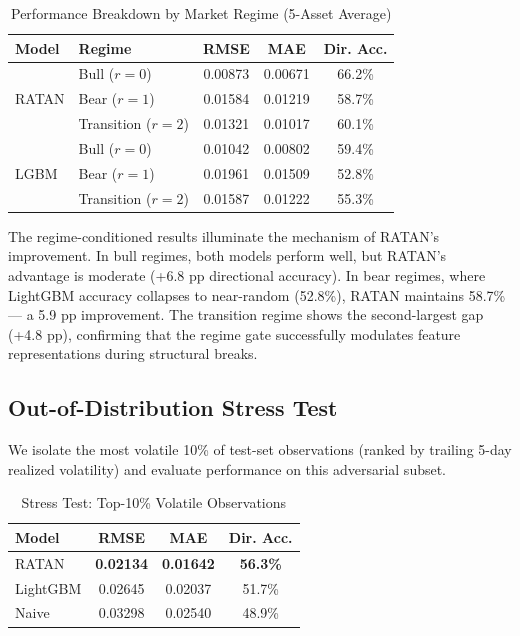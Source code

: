 \documentclass[conference]{IEEEtran}
\begin{document}
\begin{table}[ht]
\centering
\caption{Performance Breakdown by Market Regime (5-Asset Average)}
\label{tab:regime}
\begin{tabular}{@{}llccc@{}}
\toprule
\textbf{Model} & \textbf{Regime} & \textbf{RMSE} & \textbf{MAE} & \textbf{Dir. Acc.} \\
\midrule
\multirow{3}{*}{RATAN}
& Bull ($r=0$)       & 0.00873 & 0.00671 & 66.2\% \\
& Bear ($r=1$)       & 0.01584 & 0.01219 & 58.7\% \\
& Transition ($r=2$) & 0.01321 & 0.01017 & 60.1\% \\
\midrule
\multirow{3}{*}{LGBM}
& Bull ($r=0$)       & 0.01042 & 0.00802 & 59.4\% \\
& Bear ($r=1$)       & 0.01961 & 0.01509 & 52.8\% \\
& Transition ($r=2$) & 0.01587 & 0.01222 & 55.3\% \\
\bottomrule
\end{tabular}
\end{table}

The regime-conditioned results illuminate the mechanism of RATAN's improvement. In bull regimes, both models perform well, but RATAN's advantage is moderate (+6.8 pp directional accuracy). In bear regimes, where LightGBM accuracy collapses to near-random (52.8\%), RATAN maintains 58.7\% --- a 5.9 pp improvement. The transition regime shows the second-largest gap (+4.8 pp), confirming that the regime gate successfully modulates feature representations during structural breaks.

\subsection{Out-of-Distribution Stress Test}

We isolate the most volatile 10\% of test-set observations (ranked by trailing 5-day realized volatility) and evaluate performance on this adversarial subset.

\begin{table}[ht]
\centering
\caption{Stress Test: Top-10\% Volatile Observations}
\label{tab:stress}
\begin{tabular}{@{}lccc@{}}
\toprule
\textbf{Model} & \textbf{RMSE} & \textbf{MAE} & \textbf{Dir. Acc.} \\
\midrule
RATAN         & \textbf{0.02134} & \textbf{0.01642} & \textbf{56.3\%} \\
LightGBM      & 0.02645 & 0.02037 & 51.7\% \\
Naive         & 0.03298 & 0.02540 & 48.9\% \\
\bottomrule
\end{tabular}
\end{table}
\end{document}
